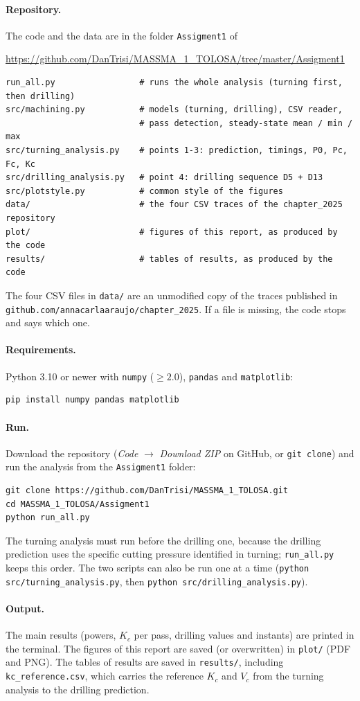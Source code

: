 \documentclass[11pt,a4paper]{article}
\begin{document}
\paragraph{Repository.} The code and the data are in the folder \texttt{Assigment1} of
\begin{center}
\url{https://github.com/DanTrisi/MASSMA_1_TOLOSA/tree/master/Assigment1}
\end{center}
\begin{lstlisting}
run_all.py                 # runs the whole analysis (turning first, then drilling)
src/machining.py           # models (turning, drilling), CSV reader,
                           # pass detection, steady-state mean / min / max
src/turning_analysis.py    # points 1-3: prediction, timings, P0, Pc, Fc, Kc
src/drilling_analysis.py   # point 4: drilling sequence D5 + D13
src/plotstyle.py           # common style of the figures
data/                      # the four CSV traces of the chapter_2025 repository
plot/                      # figures of this report, as produced by the code
results/                   # tables of results, as produced by the code
\end{lstlisting}
The four CSV files in \texttt{data/} are an unmodified copy of the traces published in
\texttt{github.com/annacarlaaraujo/chapter\_2025}. If a file is missing, the code stops
and says which one.

\paragraph{Requirements.} Python 3.10 or newer with \texttt{numpy} ($\geq 2.0$),
\texttt{pandas} and \texttt{matplotlib}:
\begin{lstlisting}
pip install numpy pandas matplotlib
\end{lstlisting}

\paragraph{Run.} Download the repository (\emph{Code} $\rightarrow$ \emph{Download ZIP}
on GitHub, or \texttt{git clone}) and run the analysis from the \texttt{Assigment1}
folder:
\begin{lstlisting}
git clone https://github.com/DanTrisi/MASSMA_1_TOLOSA.git
cd MASSMA_1_TOLOSA/Assigment1
python run_all.py
\end{lstlisting}
The turning analysis must run before the drilling one, because the drilling prediction
uses the specific cutting pressure identified in turning; \texttt{run\_all.py} keeps this
order. The two scripts can also be run one at a time
(\texttt{python src/turning\_analysis.py}, then \texttt{python src/drilling\_analysis.py}).

\paragraph{Output.} The main results (powers, $K_c$ per pass, drilling values and
instants) are printed in the terminal. The figures of this report are saved (or
overwritten) in \texttt{plot/} (PDF and PNG). The tables of results are saved in
\texttt{results/},
including \texttt{kc\_reference.csv}, which carries the reference $K_c$ and $V_c$
from the turning analysis to the drilling prediction.
\end{document}
